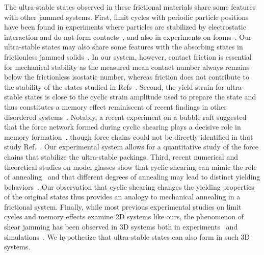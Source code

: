 \documentclass[twocolumn,showkeys,superscriptaddress,preprintnumbers,amsmath,amssymb,showpacs,prx,longbibliography]{revtex4-2}
\begin{document}
\begin{CJK*}{UTF8}{gbsn}
The ultra-stable states observed in these frictional materials share some features with other jammed systems.  First, limit cycles with periodic particle positions have been found in experiments where particles are stabilized by electrostatic interaction and do not form contacts~\cite{keim2014_prl}, and also in experiments on foams~\cite{Lundberg2008_pre}. Our ultra-stable states may also share some features with the absorbing states in frictionless jammed solids~\cite{kawasaki2016_pre,ness2020_prl}.
In our system, however, contact friction is essential for mechanical stability as the measured mean contact number always remains below the frictionless isostatic number, whereas friction does not contribute to the stability of the states studied in Refs~\cite{keim2014_prl,Lundberg2008_pre}. Second, the yield strain for ultra-stable states is close to the cyclic strain amplitude used to prepare the state and thus constitutes a memory effect reminiscent of recent findings in other disordered systems~\cite{fiocco2013_pre,keim2019_rmp,arceri2021_pre2,Galloway2022_natphy}.  Notably, a recent experiment on a bubble raft suggested that the force network formed during cyclic shearing plays a decisive role in memory formation~\cite{Mukherji2019_prl}, though force chains could not be directly identified in that study Ref.~\cite{Mukherji2019_prl}. Our experimental system allows for a quantitative study of the force chains that stabilize the ultra-stable packings. Third, recent numerical and theoretical studies on model glasses show that cyclic shearing can mimic the role of annealing~\cite{das2018_arxiv,yeh2020_prl} and that different degrees of annealing may lead to distinct yielding behaviors~\cite{ozawa2018_pnas,yeh2020_prl}. 
Our observation that cyclic shearing changes the yielding properties of the original states thus provides an analogy to mechanical annealing in a frictional system.  Finally, 
while most previous experimental studies on limit cycles and memory effects examine 2D systems like ours, the phenomenon of shear jamming has been observed in 3D systems both in experiments~\cite{Peters2016_nat,han2019_prl} and simulations~\cite{luding2016_nature,Baity2017_jps,Jin2018_sa,Babu_2021Soft}. We hypothesize that ultra-stable states can also form in such 3D systems.



\end{CJK*}
\end{document}

